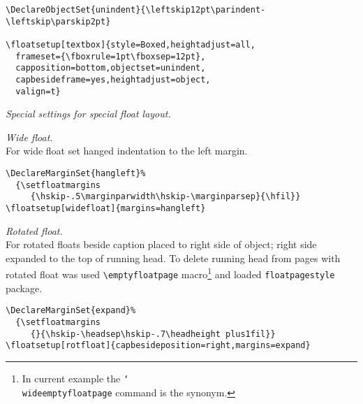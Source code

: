 \documentclass{book}
\providecommand*{\pkg}[1]{\texttt{#1}}
\providecommand*{\com}[1]{\texttt{\char`\\#1}}
\begin{document}
\begin{sl}
\begin{verbatim}
\DeclareObjectSet{unindent}{\leftskip12pt\parindent-\leftskip\parskip2pt}

\floatsetup[textbox]{style=Boxed,heightadjust=all,
  frameset={\fboxrule=1pt\fboxsep=12pt},
  capposition=bottom,objectset=unindent,
  capbesideframe=yes,heightadjust=object,
  valign=t}
\end{verbatim}

\emph{Special settings for special float layout.}

\emph{Wide float.}\\
For wide float set hanged indentation to the left margin.
\begin{verbatim}
\DeclareMarginSet{hangleft}%
  {\setfloatmargins
     {\hskip-.5\marginparwidth\hskip-\marginparsep}{\hfil}}
\floatsetup[widefloat]{margins=hangleft}
\end{verbatim}

\emph{Rotated float.}\\
For rotated floats beside caption placed to right side of object;
right side expanded to the top of running head. To delete running head from pages
with rotated float was used \verb|\emptyfloatpage| macro\footnote{In current example the
\protect\com{wideemptyfloatpage} command is the synonym.} and
loaded \pkg{floatpagestyle} package.
\begin{verbatim}
\DeclareMarginSet{expand}%
  {\setfloatmargins
     {}{\hskip-\headsep\hskip-.7\headheight plus1fil}}
\floatsetup[rotfloat]{capbesideposition=right,margins=expand}
\end{verbatim}

\end{sl}


\end{document}
